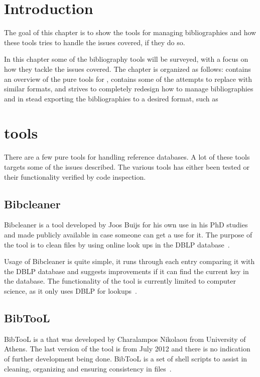 \section{Introduction}
The goal of this chapter is to show the tools for managing
bibliographies and how these tools tries to handle the issues covered,
if they do so.

In this chapter some of the bibliography tools will be surveyed, with
a focus on how they tackle the issues covered.  The chapter is
organized as follows:  contains an overview
of the pure tools for {\bibtex}, 
contains some of the attempts to replace {\bibtex} with similar
formats, and  strives to
completely redesign how to manage bibliographies and in stead
exporting the bibliographies to a desired format, such as {\bibtex}


\section{{\bibtex} tools}
\label{sec:bibtex_tools}
There are a few pure {\bibtex} tools for handling reference databases.
A lot of these tools targets some of the issues described.  The
various tools has either been tested or their functionality verified
by code inspection.

\subsection{Bibcleaner}
Bibcleaner is a tool developed by Joos Buijs for his own use in his
PhD studies and made publicly available in case someone can get a use
for it.  The purpose of the tool is to clean {\bibtex} files by using
online look ups in the DBLP database~\cite{bibcleaner_question,
  bibcleaner_source}.

Usage of Bibcleaner is quite simple, it runs through each entry
comparing it with the DBLP database and suggests improvements if it
can find the current key in the database.  The functionality of the
tool is currently limited to computer science, as it only uses DBLP
for lookups~\cite{bibcleaner_source}.

\subsection{BibTooL}
BibTooL is a {\bibtex} that was developed by Charalampos Nikolaou from
University of Athens.  The last version of the tool is from July 2012
and there is no indication of further development being done.  BibTooL
is a set of shell scripts to assist in cleaning, organizing and
ensuring consistency in {\bibtex} files~\cite{bibtool_site}.

